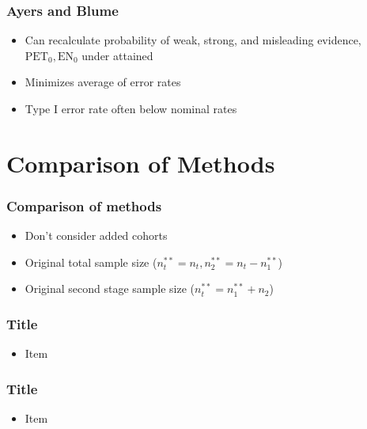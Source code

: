 \documentclass{beamer}\usepackage[]{graphicx}\usepackage[]{color}
\begin{document}
\begin{frame}
\frametitle{Ayers and Blume}
    \begin{itemize}
        \item Can recalculate probability of weak, strong, and misleading evidence, $\mbox{PET}_0, \mbox{EN}_0$  under attained
        \item Minimizes average of error rates
        \item Type I error rate often below nominal rates %
    \end{itemize}
\end{frame}

\section{Comparison of Methods}
\begin{frame}
\frametitle{Comparison of methods}
    \begin{itemize}
        \item Don't consider added cohorts
        \item Original total sample size ($n_t^{\ast\ast}=n_t, n_2^{\ast\ast}=n_t-n_1^{\ast\ast}$)
        \item Original second stage sample size ($n_t^{\ast\ast} = n_1^{\ast\ast} + n_2$)
    \end{itemize}
\end{frame}

\begin{frame}
\frametitle{Title}
    \begin{itemize}
        \item Item
    \end{itemize}
\end{frame}

\begin{frame}
\frametitle{Title}
    \begin{itemize}
        \item Item
    \end{itemize}
\end{frame}
\end{document}
